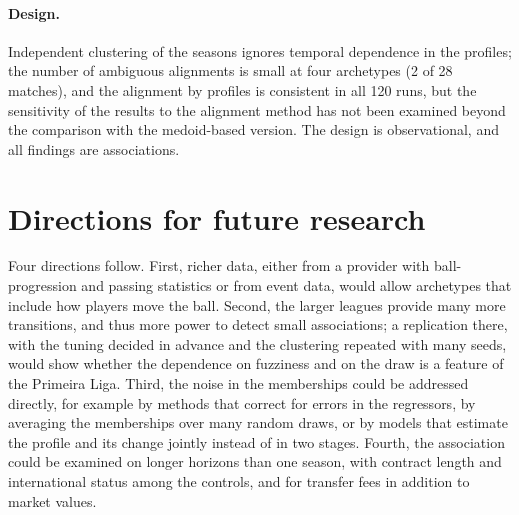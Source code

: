 \paragraph{Design.} Independent clustering of the seasons ignores temporal dependence in the profiles; the number of ambiguous alignments is small at four archetypes (2 of 28 matches), and the alignment by profiles is consistent in all 120 runs, but the sensitivity of the results to the alignment method has not been examined beyond the comparison with the medoid-based version. The design is observational, and all findings are associations.

\section{Directions for future research}
\label{sec:disc-future}

Four directions follow. First, richer data, either from a provider with ball-progression and passing statistics or from event data, would allow archetypes that include how players move the ball. Second, the larger leagues provide many more transitions, and thus more power to detect small associations; a replication there, with the tuning decided in advance and the clustering repeated with many seeds, would show whether the dependence on fuzziness and on the draw is a feature of the Primeira Liga. Third, the noise in the memberships could be addressed directly, for example by methods that correct for errors in the regressors, by averaging the memberships over many random draws, or by models that estimate the profile and its change jointly instead of in two stages. Fourth, the association could be examined on longer horizons than one season, with contract length and international status among the controls, and for transfer fees in addition to market values.
